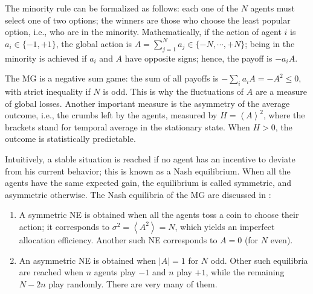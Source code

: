 \documentclass[aps,twocolumn,nofootinbib,sortedaddress,reprint]{revtex4-1}
\begin{document}
The minority rule can be formalized as follows: each one of the $N$ agents
must select one of two options; the winners are those who choose the
least popular option, i.e., who are in the minority.  Mathematically,
if the action of agent $i$ is $a_{i}\in\{-1,+1\}$, the global action
is $A=\sum_{j=1}^{N}a_{j}\in\{-N,\cdots,+N\}$; being in the minority
is achieved if $a_{i}$ and $A$ have opposite signs; hence, the payoff
is $-a_{i}A$.

The MG is a negative sum game: the sum of all payoffs is $-\sum_i a_i
A=-A^2\le 0$, with strict inequality if $N$ is odd. This is why the
fluctuations of $A$ are a measure of global losses. Another important measure
is the asymmetry of the average outcome, i.e., the crumbs left by the
agents, measured by $H=\left<A\right>^2$, where the brackets stand for temporal average in the stationary state. When $H>0$, the outcome is
statistically predictable.

Intuitively, a stable situation is reached if no agent has an
incentive to deviate from his current behavior; this is known as a
Nash equilibrium. When all the agents have the
same expected gain, the equilibrium is called symmetric, and
asymmetric otherwise.  The Nash equilibria of the MG are discussed in
\textcite{MC00}:
\begin{enumerate}
\item A symmetric NE is obtained when all the agents toss a coin to
  choose their action; it corresponds to
  $\sigma^2=\left<A^2\right>=N$, which yields an imperfect
  allocation efficiency. Another such NE corresponds to $A=0$ (for
  $N$ even).
\item An asymmetric NE is obtained when $|A|=1$ for $N$ odd. Other
  such equilibria are reached when $n$ agents play $-1$ and $n$ play
  $+1$, while the remaining $N-2n$ play randomly. There are very
  many of them.
\end{enumerate}
\end{document}
